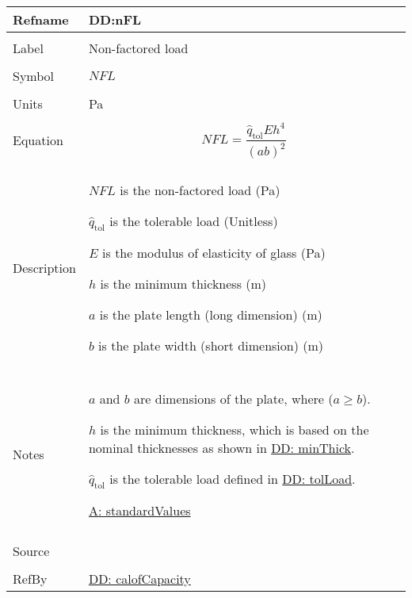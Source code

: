\documentclass[12pt]{article}
\begin{document}
\vspace{\baselineskip}
\noindent
\begin{minipage}{\textwidth}
\begin{tabular}{>{\raggedright}p{}>{\raggedright\arraybackslash}p{}}
\toprule \textbf{Refname} & \textbf{DD:nFL}
\label{DD:nFL}
\\ \midrule \\
Label & Non-factored load
        
\\ \midrule \\
Symbol & $NFL$
         
\\ \midrule \\
Units & Pa
        
\\ \midrule \\
Equation & \begin{displaymath}
           NFL=\frac{{\hat{q}_{\text{tol}}} E h^{4}}{\left(a b\right)^{2}}
           \end{displaymath}
\\ \midrule \\
Description & \begin{symbDescription}
              \item{$NFL$ is the non-factored load (Pa)}
              \item{${\hat{q}_{\text{tol}}}$ is the tolerable load (Unitless)}
              \item{$E$ is the modulus of elasticity of glass (Pa)}
              \item{$h$ is the minimum thickness (m)}
              \item{$a$ is the plate length (long dimension) (m)}
              \item{$b$ is the plate width (short dimension) (m)}
              \end{symbDescription}
\\ \midrule \\
Notes & $a$ and $b$ are dimensions of the plate, where ($a\geq{}b$).
        
        $h$ is the minimum thickness, which is based on the nominal thicknesses as shown in \hyperref[DD:minThick]{DD: minThick}.
        
        ${\hat{q}_{\text{tol}}}$ is the tolerable load defined in \hyperref[DD:tolLoad]{DD: tolLoad}.
        
        \hyperref[assumpSV]{A: standardValues}
        
\\ \midrule \\
Source & \cite{astm2009}
         
\\ \midrule \\
RefBy & \hyperref[DD:calofCapacity]{DD: calofCapacity}
        
\\ \bottomrule
\end{tabular}
\end{minipage}
\end{document}
